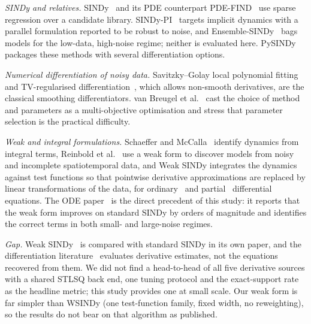 \textit{SINDy and relatives.} SINDy~\cite{brunton2015discovering} and its PDE counterpart PDE-FIND~\cite{rudy2016data} use sparse regression over a candidate library. SINDy-PI~\cite{kaheman2020sindy} targets implicit dynamics with a parallel formulation reported to be robust to noise, and Ensemble-SINDy~\cite{fasel2021ensemble} bags models for the low-data, high-noise regime; neither is evaluated here. PySINDy~\cite{silva2020pysindy} packages these methods with several differentiation options.

\textit{Numerical differentiation of noisy data.} Savitzky--Golay local polynomial fitting~\cite{savitzky1964smoothing} and TV-regularised differentiation~\cite{chartrand2011numerical}, which allows non-smooth derivatives, are the classical smoothing differentiators. van Breugel et al.~\cite{breugel2020numerical} cast the choice of method and parameters as a multi-objective optimisation and stress that parameter selection is the practical difficulty.

\textit{Weak and integral formulations.} Schaeffer and McCalla~\cite{schaeffer2017sparse} identify dynamics from integral terms, Reinbold et al.~\cite{reinbold2020using} use a weak form to discover models from noisy and incomplete spatiotemporal data, and Weak SINDy integrates the dynamics against test functions so that pointwise derivative approximations are replaced by linear transformations of the data, for ordinary~\cite{messenger2021weak} and partial~\cite{messenger2020weak} differential equations. The ODE paper~\cite{messenger2021weak} is the direct precedent of this study: it reports that the weak form improves on standard SINDy by orders of magnitude and identifies the correct terms in both small- and large-noise regimes.

\textit{Gap.} Weak SINDy~\cite{messenger2021weak} is compared with standard SINDy in its own paper, and the differentiation literature~\cite{breugel2020numerical,chartrand2011numerical} evaluates derivative estimates, not the equations recovered from them. We did not find a head-to-head of all five derivative sources with a shared STLSQ back end, one tuning protocol and the exact-support rate as the headline metric; this study provides one at small scale. Our weak form is far simpler than WSINDy (one test-function family, fixed width, no reweighting), so the results do not bear on that algorithm as published.
